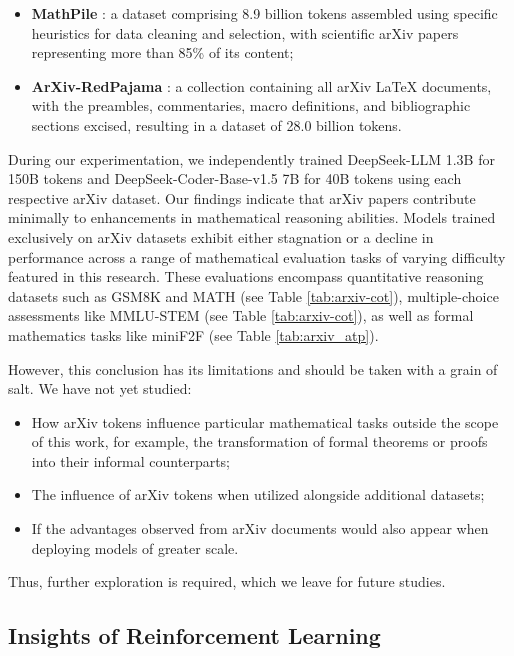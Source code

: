 \begin{itemize}[topsep=0pt]
\begin{itemize}[topsep=0pt]
\begin{itemize}[topsep=0pt]
    \item \textbf{MathPile} \citep{mathpile}: a dataset comprising 8.9 billion tokens assembled using specific heuristics for data cleaning and selection, with scientific arXiv papers representing more than 85\% of its content;
    \item \textbf{ArXiv-RedPajama} \citep{redpajama}: a collection containing all arXiv LaTeX documents, with the preambles, commentaries, macro definitions, and bibliographic sections excised, resulting in a dataset of 28.0 billion tokens.
\end{itemize}

During our experimentation, we independently trained DeepSeek-LLM 1.3B for 150B tokens and DeepSeek-Coder-Base-v1.5 7B for 40B tokens using each respective arXiv dataset. Our findings indicate that arXiv papers contribute minimally to enhancements in mathematical reasoning abilities. Models trained exclusively on arXiv datasets exhibit either stagnation or a decline in performance across a range of mathematical evaluation tasks of varying difficulty featured in this research. These evaluations encompass quantitative reasoning datasets such as GSM8K and MATH (see Table \ref{tab:arxiv-cot}), multiple-choice assessments like MMLU-STEM (see Table \ref{tab:arxiv-cot}), as well as formal mathematics tasks like miniF2F (see Table \ref{tab:arxiv_atp}).

However, this conclusion has its limitations and should be taken with a grain of salt. We have not yet studied:

\begin{itemize}[topsep=0pt]
    \item How arXiv tokens influence particular mathematical tasks outside the scope of this work, for example, the transformation of formal theorems or proofs into their informal counterparts;
    \item The influence of arXiv tokens when utilized alongside additional datasets;
    \item If the advantages observed from arXiv documents would also appear when deploying models of greater scale.
\end{itemize}

Thus, further exploration is required, which we leave for future studies.

\subsection{Insights of Reinforcement Learning}

\end{itemize}
\end{itemize}
